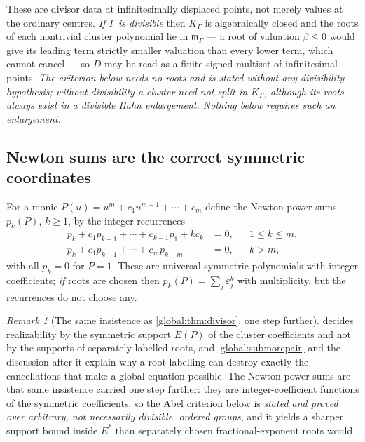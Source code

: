 \documentclass[11pt,letterpaper]{article}
\theoremstyle{definition}
\theoremstyle{remark}
\newtheorem{remark}[remark]{Remark}
\newcommand{\KK}{K_\Gamma}
\newcommand{\mK}{\mathfrak m_\Gamma}
\numberwithin{equation}{section}
\begin{document}
These are divisor data at infinitesimally displaced points, not merely values at the ordinary centres. \emph{If $\Gamma$ is divisible} then $\KK$ is algebraically closed \cite[Corollary~4]{Poonen} and the roots of each nontrivial cluster polynomial lie in $\mK$ --- a root of valuation $\beta\le0$ would give its leading term strictly smaller valuation than every lower term, which cannot cancel --- so $D$ may be read as a finite signed multiset of infinitesimal points. \emph{The criterion below needs no roots and is stated without any divisibility hypothesis; without divisibility a cluster need not split in $\KK$, although its roots always exist in a divisible Hahn enlargement. Nothing below requires such an enlargement.}

\subsection{Newton sums are the correct symmetric coordinates}

For a monic $P(u)=u^m+c_1u^{m-1}+\cdots+c_m$ define the Newton power sums $p_k(P)$, $k\ge1$, by the integer recurrences
\begin{align}
  p_k+c_1p_{k-1}+\cdots+c_{k-1}p_1+kc_k&=0,&&1\le k\le m,\label{global:eq:newtonlow}\\
  p_k+c_1p_{k-1}+\cdots+c_mp_{k-m}&=0,&&k>m,\label{global:eq:newtonhigh}
\end{align}
with all $p_k=0$ for $P=1$. These are universal symmetric polynomials with integer coefficients; \emph{if} roots are chosen then $p_k(P)=\sum_j\varepsilon_j^k$ with multiplicity, but the recurrences do not choose any.

\begin{remark}[The same insistence as \cref{global:thm:divisor}, one step further]\label{global:rem:symmetricagain}
 decides realizability by the symmetric support $E(P)$ of the cluster coefficients and not by the supports of separately labelled roots, and \cref{global:sub:norepair} and the discussion after it explain why a root labelling can destroy exactly the cancellations that make a global equation possible. The Newton power sums are that same insistence carried one step further: they are integer-coefficient functions of the symmetric coefficients, so the Abel criterion below is \emph{stated and proved over arbitrary, not necessarily divisible, ordered groups}, and it yields a sharper support bound inside $E^*$ than separately chosen fractional-exponent roots would.
\end{remark}
\end{document}
